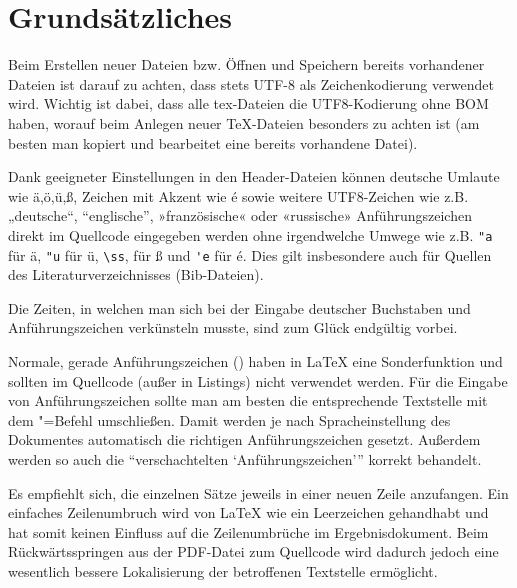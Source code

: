 \section[Grundsätzliches]{Grundsätzliches}%
\label{sec:Grundsätzliches}
%
Beim Erstellen neuer Dateien bzw. Öffnen und Speichern bereits vorhandener Dateien ist darauf zu achten,
dass stets UTF-8 als Zeichenkodierung verwendet wird.
Wichtig ist dabei, dass alle tex-Dateien die UTF8-Kodierung ohne BOM haben,
worauf beim Anlegen neuer TeX-Dateien besonders zu achten ist
(am besten man kopiert und bearbeitet eine bereits vorhandene Datei).

Dank geeigneter Einstellungen in den Header-Dateien können deutsche Umlaute wie 
%
ä,ö,ü,ß, Zeichen mit Akzent wie é sowie weitere UTF8-Zeichen wie z.B.
%
%
„deutsche“, “englische”, »französische« oder «russische» Anführungszeichen 
direkt im Quellcode eingegeben werden ohne irgendwelche Umwege wie z.B. 
\verb+"a+ für ä,
\verb+"u+ für ü,
\verb+\ss+, für ß und
\verb+'e+ für é.
Dies gilt insbesondere auch für Quellen des Literaturverzeichnisses (Bib-Dateien).

Die Zeiten, in welchen man sich bei der Eingabe deutscher Buchstaben und Anführungszeichen verkünsteln musste,
sind zum Glück endgültig vorbei.

Normale, gerade Anführungszeichen (\texttt{{\dq}}) haben in \LaTeX{} eine Sonderfunktion und sollten im Quellcode (außer in Listings) nicht verwendet werden.
Für die Eingabe von Anführungszeichen sollte man am besten die entsprechende Textstelle mit dem "=Befehl umschließen.
Damit werden je nach Spracheinstellung des Dokumentes automatisch die richtigen Anführungszeichen gesetzt.
Außerdem werden so auch die \enquote{verschachtelten \enquote{Anführungszeichen}} korrekt behandelt.

Es empfiehlt sich, die einzelnen Sätze jeweils in einer neuen Zeile anzufangen.
Ein einfaches Zeilenumbruch wird von LaTeX wie ein Leerzeichen gehandhabt
und hat somit keinen Einfluss auf die Zeilenumbrüche im Ergebnisdokument.
Beim Rückwärtsspringen aus der PDF-Datei zum Quellcode wird dadurch jedoch
eine wesentlich bessere Lokalisierung der betroffenen Textstelle ermöglicht.